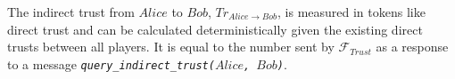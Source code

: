 \begin{definition}
  The indirect trust from $Alice$ to $Bob$, $Tr_{Alice \rightarrow Bob}$, is measured in tokens like direct trust and can be
  calculated deterministically given the existing direct trusts between all players. It is equal to the number sent by
  $\mathcal{F}_{Trust}$ as a response to a message \emph{\texttt{query\_indirect\_trust(}$Alice$\texttt{, }$Bob$\texttt{)}}.
\end{definition}

